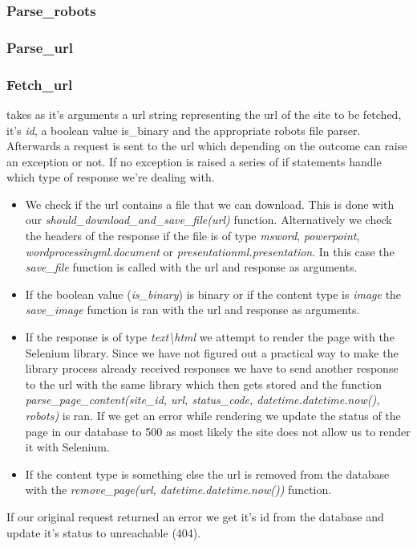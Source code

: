 \documentclass[runningheads]{llncs}
\begin{document}
\subsubsection{Parse\_robots}
\subsubsection{Parse\_url}
\subsubsection{Fetch\_url}
takes as it's arguments a url string representing the url of the site to be fetched, it's  \textit{id}, a boolean value is\_binary and the appropriate robots file parser. Afterwards a request is sent to the url which depending on the outcome can raise an exception or not. If no exception is raised a series of if statements handle which type of response we're dealing with. 
\begin{itemize}
  \item We check if the url contains a file that we can download. This is done with our \textit{should\_download\_and\_save\_file(url)} function. Alternatively we check the headers of the response if the file is of type \textit{msword}, \textit{powerpoint}, \textit{wordprocessingml.document} or \textit{presentationml.presentation}. In this case the \textit{save\_file} function is called with the url and response as arguments.
  \item If the boolean value (\textit{is\_binary}) is binary or if the content type is \textit{image} the \textit{save\_image} function is ran with the url and response as arguments.
  \item If the response is of type \textit{text\textbackslash html} we attempt to render the page with the Selenium library. Since we have not figured out a practical way to make the library process already received responses we have to send another response to the url with the same library which then gets stored and the function \textit{parse\_page\_content(site\_id, url, status\_code, datetime.datetime.now(), robots)} is ran. If we get an error while rendering we update the status of the page in our database to 500 as most likely the site does not allow us to render it with Selenium.
  \item If the content type is something else the url is removed from the database with the \textit{remove\_page(url, datetime.datetime.now())} function.
\end{itemize}
If our original request returned an error we get it's id from the database and update it's status to unreachable (404).
\begin{lstlisting}

\end{lstlisting}
\end{document}
